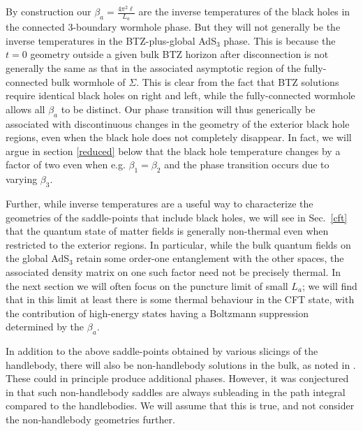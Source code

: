 \documentclass[12pt]{article}
\numberwithin{equation}{section}
\begin{document}
By construction our $\beta_a = \frac{4 \pi^2 \ell}{L_a}$ are the inverse temperatures of the black holes in the connected 3-boundary wormhole phase. But they will not generally be the inverse temperatures in the BTZ-plus-global AdS${}_3$ phase. This is because the $t=0$ geometry outside a given bulk BTZ horizon after disconnection is not generally the same as that in the associated asymptotic region of the fully-connected bulk wormhole of $\Sigma$.  This is clear from the fact that BTZ solutions require identical black holes on right and left, while the fully-connected wormhole allows all $\beta_a$ to be distinct.  Our phase transition will thus generically be associated with discontinuous changes in the geometry of the exterior black hole regions, even when the black hole does not completely disappear.  In fact, we will argue in section \ref{reduced} below that the black hole temperature changes by a factor of two even when e.g. $\beta_1 = \beta_2$ and the phase transition occurs due to varying $\beta_3$.

Further, while inverse temperatures are a useful way to characterize the geometries of the saddle-points that include black holes, we will see in Sec.~\ref{cft} that the quantum state of matter fields is generally non-thermal even when restricted to the exterior regions. In particular, while the bulk quantum fields on the global AdS${}_3$ retain some order-one entanglement with the other spaces, the associated density matrix on one such factor need not be precisely thermal. In the next section we will often focus on the puncture limit of small $L_a$; we will find that in this limit at least there is some thermal behaviour in the CFT state, with the contribution of high-energy states having a Boltzmann suppression determined by the $\beta_a$.

In addition to the above saddle-points obtained by various slicings of the handlebody, there will also be non-handlebody solutions in the bulk, as noted in \cite{Yin:2007at}. These could in principle produce additional phases. However, it was conjectured in \cite{Yin:2007at} that such non-handlebody saddles are always subleading in the path integral compared to the handlebodies. We will assume that this is true, and not consider the non-handlebody geometries further.
\end{document}
